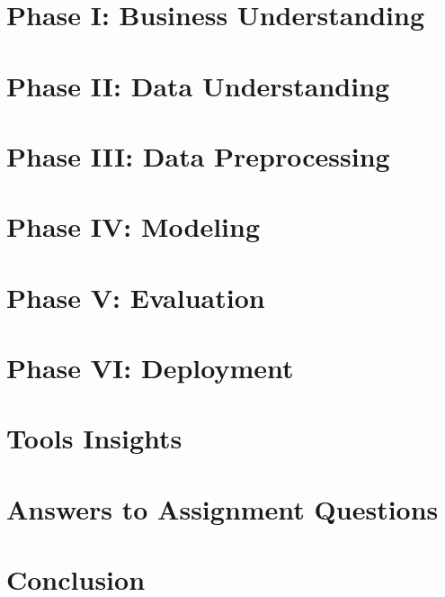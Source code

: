 \documentclass[12pt,a4paper,notitlepage]{report}
\begin{document}







\clearpage
{}

\chapter{Phase I: Business Understanding}


\chapter{Phase II: Data Understanding}


\chapter{Phase III: Data Preprocessing}


\chapter{Phase IV: Modeling}


\chapter{Phase V: Evaluation}


\chapter{Phase VI: Deployment}


\chapter{Tools Insights}



\chapter{Answers to Assignment Questions}



\chapter{Conclusion}


\printbibliography
\end{document}
